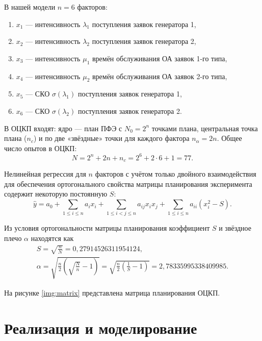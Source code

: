\documentclass[a4paper, 14pt]{extreport}
\begin{document}
\begin{MainPart}
В нашей модели $n = 6$ факторов:
\begin{enumerate}
	\item $x_1$ — интенсивность $\lambda_1$ поступления заявок генератора 1,
	\item $x_2$ — интенсивность $\lambda_2$ поступления заявок генератора 2,
	\item $x_3$ — интенсивность $\mu_1$ времён обслуживания ОА заявок 1-го типа,
	\item $x_4$ — интенсивность $\mu_2$ времён обслуживания ОА заявок 2-го типа,
	\item $x_5$ — СКО $\sigma(\lambda_1)$ поступления заявок генератора 1,
	\item $x_6$ — СКО $\sigma(\lambda_2)$ поступления заявок генератора 2.
\end{enumerate}

В ОЦКП входят: ядро — план ПФЭ с $N_0 = 2^n$ точками плана, центральная точка плана ($n_c$) и по две «звёздные» точки для каждого фактора $n_\alpha = 2n$.
Общее число опытов в ОЦКП:
\begin{equation}
	N = 2^n + 2n + n_c = 2^6 + 2 \cdot 6 + 1 = 77.
\end{equation}

Нелинейная регрессия для $n$ факторов с учётом только двойного взаимодействия для обеспечения ортогонального свойства матрицы планирования эксперимента содержит некоторую постоянную $S$:
\begin{equation}
	\hat y = a_0 + \sum_{1 \leqslant i \leqslant n}a_ix_i + \sum_{1 \leqslant i < j \leqslant n}a_{ij}x_ix_j + \sum_{1 \leqslant i \leqslant n}a_{ii}(x_i^2-S).
\end{equation}

Из условия ортогональности матрицы планирования коэффициент $S$ и звёздное плечо $\alpha$ находятся как
\begin{gather}
	S = \sqrt{\frac nN} = 0,27914526311954124, \\
	\alpha = \sqrt{\frac n2 \left(\sqrt{\frac Nn} - 1\right)} = \sqrt{\frac n2 \left(\frac1S - 1\right)} = 2,78335995338409985.
\end{gather}

На рисунке \ref{img:matrix} представлена матрица планирования ОЦКП.


\section{Реализация и моделирование}




\end{MainPart}
\end{document}
